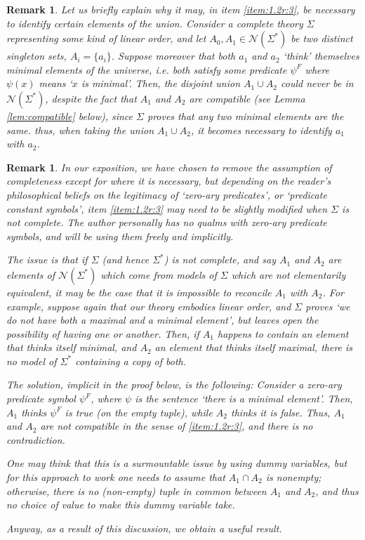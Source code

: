 \documentclass{article}
\newtheorem{remark}[theorem]{Remark}
\theoremstyle{nonumberplain}
\newcommand{\calN}{\mathcal{N}}
\begin{document}
\begin{remark}\label{rmk:whyid}
Let us briefly explain why it may, in item \ref{item:1.2r:3}, be necessary to identify certain elements of the union. Consider a complete theory $\Sigma$ representing some kind of linear order, and let $A_0, A_1 \in \calN(\Sigma^*)$ be two distinct singleton sets, $A_i = \{a_i\}$. Suppose moreover that both $a_1$ and $a_2$ `think' themselves minimal elements of the universe, i.e. both satisfy some predicate $\psi^F$ where $\psi(x)$ means `$x$ is minimal'. Then, the disjoint union $A_1 \cup A_2$ could never be in $\calN(\Sigma^*)$, despite the fact that $A_1$ and $A_2$ are compatible (see Lemma \ref{lem:compatible} below), since $\Sigma$ proves that any two minimal elements are the same. thus, when taking the union $A_1 \cup A_2$, it becomes necessary to identify $a_1$ with $a_2$.
\end{remark}

\begin{remark}\label{rmk:compatible}
In our exposition, we have chosen to remove the assumption of completeness except for where it is necessary, but depending on the reader's philosophical beliefs on the legitimacy of `zero-ary predicates', or `predicate constant symbols', item \ref{item:1.2r:3} may need to be slightly modified when $\Sigma$ is not complete. The author personally has no qualms with zero-ary predicate symbols, and will be using them freely and implicitly.

The issue is that if $\Sigma$ (and hence $\Sigma^*$) is not complete, and say $A_1$ and $A_2$ are elements of $\calN(\Sigma^*)$ which come from models of $\Sigma$ which are \emph{not} elementarily equivalent, it may be the case that it is impossible to reconcile $A_1$ with $A_2$. For example, suppose again that our theory embodies linear order, and $\Sigma$ proves `we do not have both a maximal and a minimal element', but leaves open the possibility of having one or another. Then, if $A_1$ happens to contain an element that thinks itself minimal, and $A_2$ an element that thinks itself maximal, there is no model of $\Sigma^*$ containing a copy of both.

The solution, implicit in the proof below, is the following: Consider a zero-ary predicate symbol $\psi^F$, where $\psi$ is the sentence `there is a minimal element'. Then, $A_1$ thinks $\psi^F$ is true (on the empty tuple), while $A_2$ thinks it is false. Thus, $A_1$ and $A_2$ are not compatible in the sense of \ref{item:1.2r:3}, and there is no contradiction.

One may think that this is a surmountable issue by using dummy variables, but for this approach to work one needs to assume that $A_1 \cap A_2$ is nonempty; otherwise, there is no (non-empty) tuple in common between $A_1$ and $A_2$, and thus no choice of value to make this dummy variable take.

Anyway, as a result of this discussion, we obtain a useful result.
\end{remark}
\end{document}
